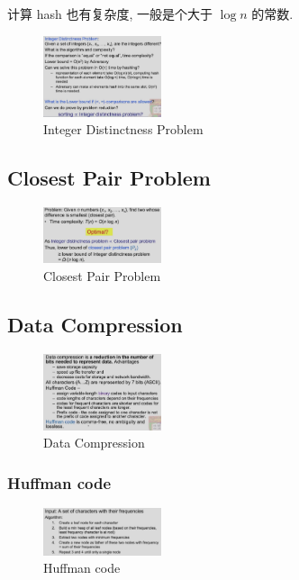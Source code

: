 计算 hash 也有复杂度, 一般是个大于 $\log n$ 的常数.

\begin{figure}[H]
    \centering
    \includegraphics[width=0.309\textwidth]{pic/DAA6//Integer Distinctness Problem}
    \caption{Integer Distinctness Problem}
\end{figure}


\subsection{Closest Pair Problem}

\begin{figure}[H]
    \centering
    \includegraphics[width=0.309\textwidth]{pic/DAA6/Closest Pair Problem}
    \caption{Closest Pair Problem}
\end{figure}

\subsection{Data Compression}

\begin{figure}[H]
    \centering
    \includegraphics[width=0.309\textwidth]{pic/DAA6/Data Compression}
    \caption{Data Compression}
\end{figure}

\subsubsection{Huffman code}
\begin{figure}[H]
    \centering
    \includegraphics[width=0.309\textwidth]{pic/DAA6/Huffman code}
    \caption{Huffman code}
\end{figure}

